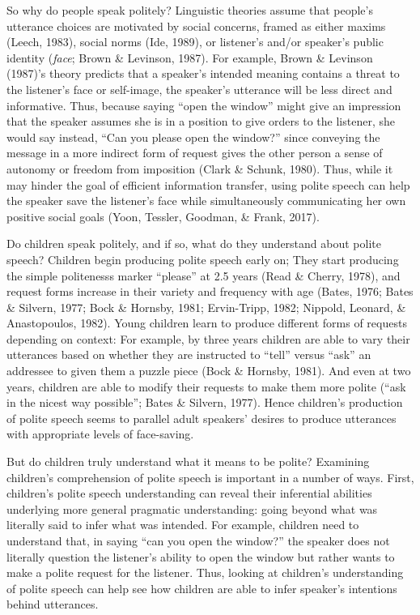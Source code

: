 \documentclass[10pt, letterpaper]{article}
\begin{document}
So why do people speak politely? Linguistic theories assume that
people's utterance choices are motivated by social concerns, framed as
either maxims (Leech, 1983), social norms (Ide, 1989), or listener's
and/or speaker's public identity (\emph{face}; Brown \& Levinson, 1987).
For example, Brown \& Levinson (1987)'s theory predicts that a speaker's
intended meaning contains a threat to the listener's face or self-image,
the speaker's utterance will be less direct and informative. Thus,
because saying ``open the window'' might give an impression that the
speaker assumes she is in a position to give orders to the listener, she
would say instead, ``Can you please open the window?'' since conveying
the message in a more indirect form of request gives the other person a
sense of autonomy or freedom from imposition (Clark \& Schunk, 1980).
Thus, while it may hinder the goal of efficient information transfer,
using polite speech can help the speaker save the listener's face while
simultaneously communicating her own positive social goals (Yoon,
Tessler, Goodman, \& Frank, 2017).

Do children speak politely, and if so, what do they understand about
polite speech? Children begin producing polite speech early on; They
start producing the simple politenesss marker ``please'' at 2.5 years
(Read \& Cherry, 1978), and request forms increase in their variety and
frequency with age (Bates, 1976; Bates \& Silvern, 1977; Bock \&
Hornsby, 1981; Ervin-Tripp, 1982; Nippold, Leonard, \& Anastopoulos,
1982). Young children learn to produce different forms of requests
depending on context: For example, by three years children are able to
vary their utterances based on whether they are instructed to ``tell''
versus ``ask'' an addressee to given them a puzzle piece (Bock \&
Hornsby, 1981). And even at two years, children are able to modify their
requests to make them more polite (``ask in the nicest way possible'';
Bates \& Silvern, 1977). Hence children's production of polite speech
seems to parallel adult speakers' desires to produce utterances with
appropriate levels of face-saving.

But do children truly understand what it means to be polite? Examining
children's comprehension of polite speech is important in a number of
ways. First, children's polite speech understanding can reveal their
inferential abilities underlying more general pragmatic understanding:
going beyond what was literally said to infer what was intended. For
example, children need to understand that, in saying ``can you open the
window?'' the speaker does not literally question the listener's ability
to open the window but rather wants to make a polite request for the
listener. Thus, looking at children's understanding of polite speech can
help see how children are able to infer speaker's intentions behind
utterances.
\end{document}
